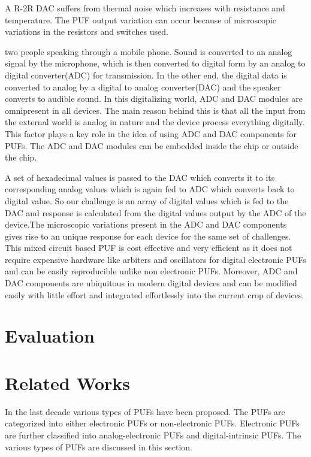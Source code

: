 A R-2R DAC suffers from thermal noise which increases with resistance and temperature. The PUF output variation can occur because of microscopic variations in the resistors and switches used.


two people speaking through a mobile phone. Sound is converted to an analog signal by the microphone, which is
then converted to digital form by an analog to digital converter(ADC) for transmission. In the other end, the digital
data is converted to analog by a digital to analog converter(DAC) and the speaker converts to audible sound. In this
digitalizing world, ADC and DAC modules are omnipresent in all devices. The main reason behind this is that all the input from
the external world is analog in nature and the device process everything digitally. This factor plays a key role in
the idea of using ADC and DAC components for PUFs. The ADC and DAC modules can be embedded inside the chip or outside the chip.

A set of hexadecimal values is passed to the DAC which converts it to its corresponding analog values which is again fed to ADC which converts back to digital value. So our challenge is an array of digital values which is fed to the DAC and response is calculated from the digital values output by the ADC of the device.The microscopic variations present in the ADC and DAC components gives rise to an unique response for each device for the same set of challenges. This mixed circuit based PUF is cost effective and very efficient as it does not require expensive hardware like arbiters and oscillators for digital electronic PUFs and can be easily reproducible unlike non electronic PUFs. Moreover, ADC and DAC components are ubiquitous in modern digital devices and can be modified easily with little effort and integrated effortlessly into the current crop of devices.



\section{Evaluation}




\section{Related Works}
In the last decade various types of PUFs have been proposed. The PUFs are categorized into either
electronic PUFs or non-electronic PUFs. Electronic PUFs are further classified into analog-electronic
PUFs and digital-intrinsic PUFs. The various types of PUFs are discussed in this section.

